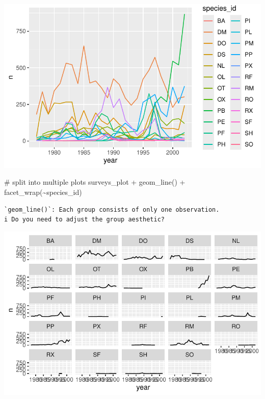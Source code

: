 \documentclass[
  letterpaper,
  DIV=11,
  numbers=noendperiod]{scrreprt}
\newenvironment{Shaded}{\begin{snugshade}}{\end{snugshade}}
\newcommand{\CommentTok}[1]{\textcolor[rgb]{0.37,0.37,0.37}{#1}}
\newcommand{\FunctionTok}[1]{\textcolor[rgb]{0.28,0.35,0.67}{#1}}
\newcommand{\NormalTok}[1]{\textcolor[rgb]{0.00,0.23,0.31}{#1}}
\newcommand{\SpecialCharTok}[1]{\textcolor[rgb]{0.37,0.37,0.37}{#1}}
\begin{document}
\includegraphics{src/notebooks/r_files/figure-pdf/unnamed-chunk-47-3.pdf}

\begin{Shaded}
\begin{Highlighting}[]
\CommentTok{\# split into multiple plots}
\NormalTok{surveys\_plot }\SpecialCharTok{+} \FunctionTok{geom\_line}\NormalTok{() }\SpecialCharTok{+} \FunctionTok{facet\_wrap}\NormalTok{(}\SpecialCharTok{\textasciitilde{}}\NormalTok{species\_id)}
\end{Highlighting}
\end{Shaded}

\begin{verbatim}
`geom_line()`: Each group consists of only one observation.
i Do you need to adjust the group aesthetic?
\end{verbatim}

\includegraphics{src/notebooks/r_files/figure-pdf/unnamed-chunk-47-4.pdf}
\end{document}
